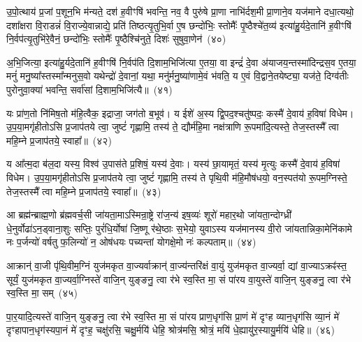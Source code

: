 {%
उ॒पो॒त्थाय॑ प्र॒जां प॒शून॒भि म॑न्यते॒ दश॑ ह॒वीꣳषि॑ भवन्ति॒ नव॒ वै पुरु॑षे प्रा॒णा नाभि॑र्दश॒मी प्रा॒णाने॒व यज॑माने दधा॒त्यथो॒ दशा᳚क्षरा वि॒राडन्नं॑ वि॒राज्ये॒वान्नाद्ये॒ प्रति॑ तिष्ठत्यृ॒तुभि॒र्वा ए॒ष छन्दो॑भिः॒ स्तोमैः᳚ पृ॒ष्ठैश्चे॑त॒व्य॑ इत्या॑हु॒र्यदे॒तानि॑ ह॒वीꣳषि॑ नि॒र्वप॑त्यृ॒तुभि॑रे॒वैनं॒ छन्दो॑भिः॒ स्तोमैः᳚ पृ॒ष्ठैश्चि॑नुते॒ दिशः॑ सुषुवा॒णेन॑~(४०)

अ॒भि॒जित्या॒ इत्या॑हु॒र्यदे॒तानि॑ ह॒वीꣳषि॑ नि॒र्वप॑ति दि॒शाम॒भिजि॑त्या ए॒तया॒ वा इन्द्रं॑ दे॒वा अ॑याजय॒न्तस्मा॑दिन्द्रस॒व ए॒तया॒ मनुं॑ मनु॒ष्या᳚स्तस्मा᳚न्मनुस॒वो यथेन्द्रो॑ दे॒वानां॒ यथा॒ मनु॑र्मनु॒ष्या॑णामे॒वं भ॑वति॒ य ए॒वं वि॒द्वाने॒तयेष्ट्या॒ यज॑ते॒ दिग्व॑तीः पुरोनुवा॒क्या॑ भवन्ति॒ सर्वा॑सां दि॒शाम॒भिजि॑त्यै॥~(४१)

{\anuvakamend[{अशा᳚न्तः सुषुवा॒णेनैक॑चत्वारिꣳशच्च}]}%

यः प्रा॑ण॒तो नि॑मिष॒तो म॑हि॒त्वैक॒ इद्राजा॒ जग॑तो ब॒भूव॑। य ईशे॑ अ॒स्य द्वि॒पद॒श्चतु॑ष्पदः॒ कस्मै॑ दे॒वाय॑ ह॒विषा॑ विधेम। उ॒प॒या॒मगृ॑हीतो\-ऽसि प्र॒जा\-प॑तये त्वा॒ जुष्टं॑ गृह्णामि॒ तस्य॑ ते॒ द्यौर्म॑हि॒मा नक्ष॑त्राणि रू॒पमा॑दि॒त्यस्ते॒ तेज॒स्तस्मै᳚ त्वा महि॒म्ने प्र॒जा\-प॑तये॒ स्वाहा᳚॥~(४२)

{\anuvakamend[{यः प्रा॑ण॒तो द्यौरा॑दि॒त्यो᳚\-ऽष्टात्रिꣳ॑शत्}]}%

य आ᳚त्म॒दा ब॑ल॒दा यस्य॒ विश्व॑ उ॒पास॑ते प्र॒शिषं॒ यस्य॑ दे॒वाः। यस्य॑ छा॒यामृतं॒ यस्य॑ मृ॒त्युः कस्मै॑ दे॒वाय॑ ह॒विषा॑ विधेम। उ॒प॒या॒मगृ॑हीतो\-ऽसि प्र॒जा\-प॑तये त्वा॒ जुष्टं॑ गृह्णामि॒ तस्य॑ ते पृथि॒वी म॑हि॒मौष॑धयो॒ वन॒स्पत॑यो रू॒पम॒ग्निस्ते॒ तेज॒स्तस्मै᳚ त्वा महि॒म्ने प्र॒जा\-प॑तये॒ स्वाहा᳚॥~(४३)

{\anuvakamend[{य आ᳚त्म॒दाः पृ॑थि॒व्य॑ग्निरेका॒न्नच॑त्वारि॒ꣳ॒शत्}]}%

आ ब्रह्म॑न्ब्राह्म॒णो ब्र॑ह्मवर्च॒सी जा॑यता॒मा\-ऽस्मिन्रा॒ष्ट्रे रा॑ज॒न्य॑ इष॒व्यः॑ शूरो॑ महार॒थो जा॑यता॒न्दोग्ध्री॑ धे॒नुर्वोढा॑\-ऽ\-न॒ड्वाना॒शुः सप्तिः॒ पुरं॑धि॒र्योषा॑ जि॒ष्णू र॑थे॒ष्ठाः स॒भेयो॒ युवा\-ऽस्य यज॑मानस्य वी॒रो जा॑यतान्निका॒मेनि॑कामे नः प॒र्जन्यो॑ वर्\mbox{}षतु फ॒लिन्यो॑ न॒ ओष॑धयः पच्यन्तां योगक्षे॒मो नः॑ कल्पताम्॥~(४४)

{\anuvakamend[{आ ब्रह्म॒न्नेक॑चत्वारिꣳशत्}]}%

आक्रान्॑ वा॒जी पृ॑थि॒वीम॒ग्निं युज॑मकृत वा॒ज्यर्वाक्रान्॑ वा॒ज्य॑न्तरि॑क्षं वा॒युं युज॑मकृत वा॒ज्यर्वा॒ द्यां वा॒ज्या\-ऽक्रꣴ॑स्त॒ सूर्यं॒ युज॑मकृत वा॒ज्यर्वा॒ग्निस्ते॑ वाजि॒न् युङ्ङनु॒ त्वा र॑भे स्व॒स्ति मा॒ सं पा॑रय वा॒युस्ते॑ वाजि॒न् युङ्ङनु॒ त्वा र॑भे स्व॒स्ति मा॒ सम्~(४५)

पा॒र॒यादि॒त्यस्ते॑ वाजि॒न् युङ्ङनु॒ त्वा र॑भे स्व॒स्ति मा॒ सं पा॑रय प्राण॒धृग॑सि प्रा॒णं मे॑ दृꣳह व्यान॒धृग॑सि व्या॒नं मे॑ दृꣳहापान॒धृग॑स्यपा॒नं मे॑ दृꣳह॒ चक्षु॑रसि॒ चक्षु॒र्मयि॑ धेहि॒ श्रोत्र॑मसि॒ श्रोत्रं॒ मयि॑ धे॒ह्यायु॑र॒स्यायु॒र्मयि॑ धेहि॥~(४६)

}
